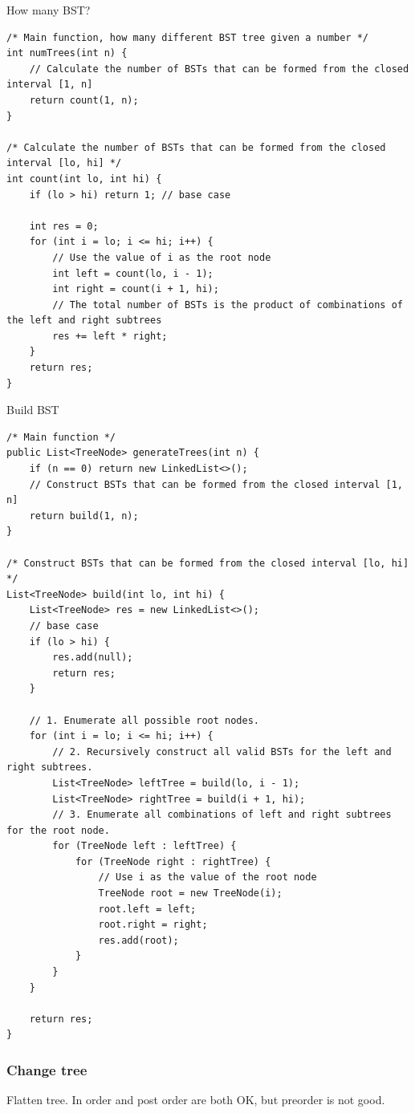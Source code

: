 \documentclass[a4paper,11pt,twoside]{book}
\begin{document}
	\par How many BST?
\begin{lstlisting}
/* Main function, how many different BST tree given a number */ 
int numTrees(int n) {
	// Calculate the number of BSTs that can be formed from the closed interval [1, n]
	return count(1, n);
}

/* Calculate the number of BSTs that can be formed from the closed interval [lo, hi] */
int count(int lo, int hi) {
	if (lo > hi) return 1; // base case
	
	int res = 0;
	for (int i = lo; i <= hi; i++) {
		// Use the value of i as the root node
		int left = count(lo, i - 1);
		int right = count(i + 1, hi);
		// The total number of BSTs is the product of combinations of the left and right subtrees
		res += left * right;
	}	
	return res;
}	
\end{lstlisting}

\par Build BST
\begin{lstlisting}
/* Main function */
public List<TreeNode> generateTrees(int n) {
	if (n == 0) return new LinkedList<>();
	// Construct BSTs that can be formed from the closed interval [1, n]
	return build(1, n);
}

/* Construct BSTs that can be formed from the closed interval [lo, hi] */
List<TreeNode> build(int lo, int hi) {
	List<TreeNode> res = new LinkedList<>();
	// base case
	if (lo > hi) {
		res.add(null);
		return res;
	}
	
	// 1. Enumerate all possible root nodes.
	for (int i = lo; i <= hi; i++) {
		// 2. Recursively construct all valid BSTs for the left and right subtrees.
		List<TreeNode> leftTree = build(lo, i - 1);
		List<TreeNode> rightTree = build(i + 1, hi);
		// 3. Enumerate all combinations of left and right subtrees for the root node.
		for (TreeNode left : leftTree) {
			for (TreeNode right : rightTree) {
				// Use i as the value of the root node
				TreeNode root = new TreeNode(i);
				root.left = left;
				root.right = right;
				res.add(root);
			}
		}
	}
	
	return res;
}
\end{lstlisting}

\subsubsection{Change tree}

	\par Flatten tree. In order and post order are both OK, but preorder is not good.
\end{document}
